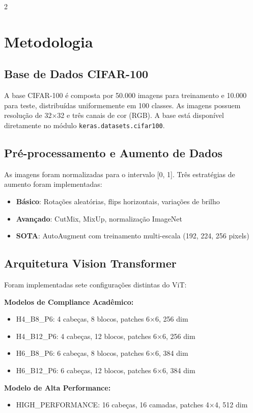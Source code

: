\documentclass[conference]{IEEEtran}
\begin{document}
\begin{multicols}{2}
\section{Metodologia}

\subsection{Base de Dados CIFAR-100}
A base CIFAR-100 é composta por 50.000 imagens para treinamento e 10.000 para teste, distribuídas uniformemente em 100 classes. As imagens possuem resolução de 32$\times$32 e três canais de cor (RGB). A base está disponível diretamente no módulo \texttt{keras.datasets.cifar100}.

\subsection{Pré-processamento e Aumento de Dados}
As imagens foram normalizadas para o intervalo [0, 1]. Três estratégias de aumento foram implementadas:
\begin{itemize}
    \item \textbf{Básico}: Rotações aleatórias, flips horizontais, variações de brilho
    \item \textbf{Avançado}: CutMix, MixUp, normalização ImageNet
    \item \textbf{SOTA}: AutoAugment com treinamento multi-escala (192, 224, 256 pixels)
\end{itemize}

\subsection{Arquitetura Vision Transformer}
Foram implementadas sete configurações distintas do ViT:

\textbf{Modelos de Compliance Acadêmico:}
\begin{itemize}
    \item H4\_B8\_P6: 4 cabeças, 8 blocos, patches 6×6, 256 dim
    \item H4\_B12\_P6: 4 cabeças, 12 blocos, patches 6×6, 256 dim
    \item H6\_B8\_P6: 6 cabeças, 8 blocos, patches 6×6, 384 dim
    \item H6\_B12\_P6: 6 cabeças, 12 blocos, patches 6×6, 384 dim
\end{itemize}

\textbf{Modelo de Alta Performance:}
\begin{itemize}
    \item HIGH\_PERFORMANCE: 16 cabeças, 16 camadas, patches 4×4, 512 dim
\end{itemize}


\end{multicols}
\end{document}
